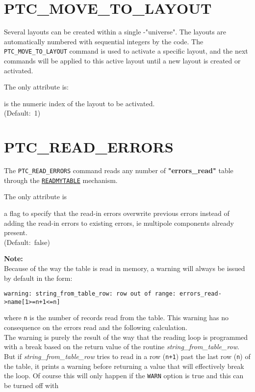 \section{PTC\_MOVE\_TO\_LAYOUT}
\label{sec:ptc_move_to_layout}

Several \ptc layouts can be created within a single \ptc-"universe". 
The layouts are automatically numbered with sequential integers by the 
\madx code. The {\tt PTC\_MOVE\_TO\_LAYOUT} command is used to
activate a specific layout, and the next \ptc commands will be
applied to this active \ptc layout until a new \ptc layout is created
or activated. 


The only attribute is:
\begin{madlist}
	 is the numeric index of the \ptc layout to be
	activated.\\ (Default:~1)
\end{madlist}

\section{PTC\_READ\_ERRORS}
\label{sec:ptc_read_errors}

The {\tt PTC\_READ\_ERRORS} command reads any number of
\textbf{"errors\_read"} table through the 
\hyperref[sec:readmytable]{\tt READMYTABLE} mechanism.


The only attribute is 
\begin{madlist}
    a flag to specify that the read-in errors
   overwrite previous errors instead of adding the read-in errors to
   existing errors, ie multipole components already present.\\
   (Default:~false)  
\end{madlist}

{\bf Note:}\\
Because of the way the table is read in memory, a warning will always be
issued by default in the form:
\begin{verbatim}
warning: string_from_table_row: row out of range: errors_read->name[1>=n+1<=n]
\end{verbatim}
where {\tt n} is  the number of records read from the table. 
This warning has no consequence on the errors read and the following
calculation. \\
The warning is purely the result of the way that the reading loop is
programmed with a break based on the return value of the routine
{\sl string\_from\_table\_row}.  
But if {\sl string\_from\_table\_row} tries to read in a row ({\tt n+1})
past the last row ({\tt n}) of the table, it prints a warning before
returning a value that will effectively break the loop. Of course this
will only happen if the {\tt WARN} option is true and this can be turned
off with 

